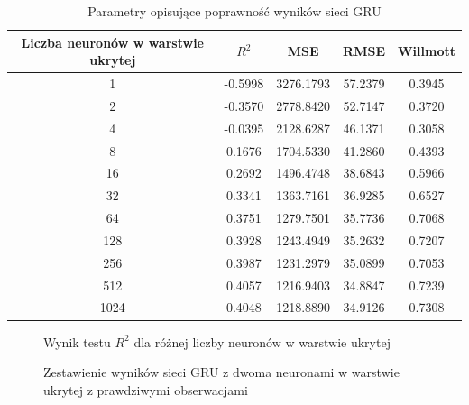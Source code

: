 \documentclass[10pt,a4paper]{article}
\begin{document}
\begin{table}[h!]
	\centering
	\begin{tabular}{|c|c|c|c|c|}
		\hline
		Liczba neuronów w warstwie ukrytej & $R^2$ & MSE & RMSE & Willmott \\
		\hline
		1    & -0.5998 & 3276.1793 & 57.2379 & 0.3945 \\
		2    & -0.3570 & 2778.8420 & 52.7147 & 0.3720 \\
		4    & -0.0395 & 2128.6287 & 46.1371 & 0.3058 \\
		8    & 0.1676  & 1704.5330 & 41.2860 & 0.4393 \\
		16   & 0.2692  & 1496.4748 & 38.6843 & 0.5966 \\
		32   & 0.3341  & 1363.7161 & 36.9285 & 0.6527 \\
		64   & 0.3751  & 1279.7501 & 35.7736 & 0.7068 \\
		128  & 0.3928  & 1243.4949 & 35.2632 & 0.7207 \\
		256  & 0.3987  & 1231.2979 & 35.0899 & 0.7053 \\
		512  & 0.4057  & 1216.9403 & 34.8847 & 0.7239 \\
		1024 & 0.4048  & 1218.8890 & 34.9126 & 0.7308 \\
		\hline
	\end{tabular}
	\caption{Parametry opisujące poprawność wyników sieci GRU}
	\label{table:gru}
\end{table}
\begin{figure}[!ht]
	\centering
	\caption{Wynik testu $R^2$ dla różnej liczby neuronów w warstwie ukrytej}
	\label{figure:gru_neurons}
\end{figure}
\FloatBarrier
\begin{figure}[!ht]
	\centering
	\caption{Zestawienie wyników sieci GRU z dwoma neuronami w warstwie ukrytej z prawdziwymi obserwacjami}
	\label{figure:gru_2}
\end{figure}
\end{document}
